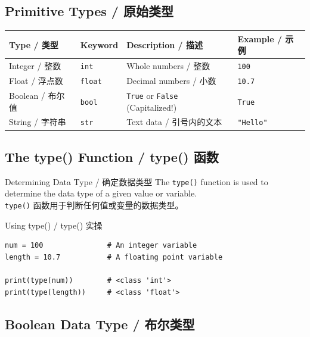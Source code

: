 \documentclass[11pt,a4paper]{article}
\begin{document}
\subsection{Primitive Types / 原始类型}

\begin{table}[h]
\centering
\renewcommand{\arraystretch}{1.5}
\begin{tabular}{@{}llll@{}}
\toprule
\textbf{Type / 类型} & \textbf{Keyword} & \textbf{Description / 描述} & \textbf{Example / 示例} \\ \midrule
Integer / 整数 & \texttt{int} & Whole numbers / 整数 & \texttt{100} \\
Float / 浮点数 & \texttt{float} & Decimal numbers / 小数 & \texttt{10.7} \\
Boolean / 布尔值 & \texttt{bool} & \texttt{True} or \texttt{False} (Capitalized!) & \texttt{True} \\
String / 字符串 & \texttt{str} & Text data / 引号内的文本 & \texttt{"Hello"} \\ \bottomrule
\end{tabular}
\end{table}

\subsection{The type() Function / type() 函数}

\begin{concept}{Determining Data Type / 确定数据类型}
    The \texttt{type()} function is used to determine the data type of a given value or variable. \\
    \texttt{type()} 函数用于判断任何值或变量的数据类型。
\end{concept}

\begin{examplebox}{Using type() / type() 实操}
\begin{lstlisting}
num = 100               # An integer variable
length = 10.7           # A floating point variable

print(type(num))        # <class 'int'>
print(type(length))     # <class 'float'>
\end{lstlisting}
\end{examplebox}

\subsection{Boolean Data Type / 布尔类型}
\end{document}
